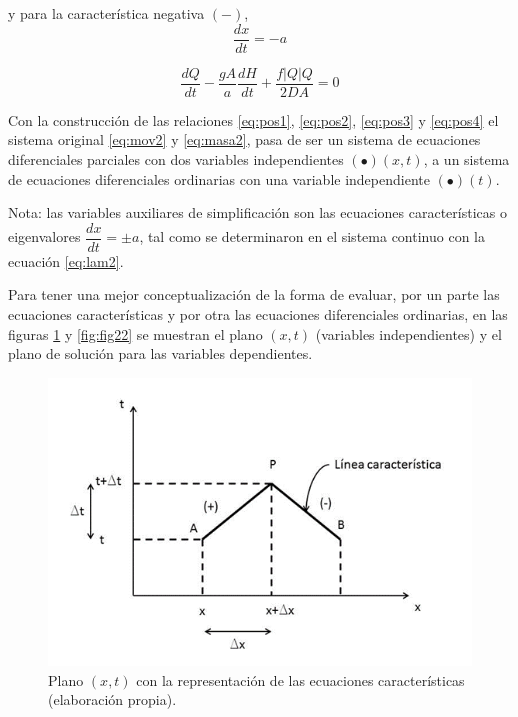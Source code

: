 \documentclass[letterpaper]{report}
\begin{document}
y para la característica negativa $(-)$,
\begin{equation}
	\frac{dx}{dt}=-a
	\label{eq:pos3}
\end{equation}

\begin{equation}
	\frac{dQ}{dt}-\frac{gA}{a}\frac{dH}{dt}+\frac{f\left|Q\right|Q}{2DA}=0
	\label{eq:pos4}
\end{equation}

Con la construcción de las relaciones \ref{eq:pos1}, \ref{eq:pos2}, \ref{eq:pos3} y \ref{eq:pos4} el sistema original \ref{eq:mov2} y \ref{eq:masa2}, pasa de ser un sistema de ecuaciones diferenciales parciales con dos variables independientes $(\bullet)(x,t)$, a un sistema de ecuaciones diferenciales ordinarias con una variable independiente $(\bullet)(t)$.\bigskip

Nota: las variables auxiliares de simplificación son las ecuaciones características o eigenvalores $\dfrac{dx}{dt}=\pm a$, tal como se determinaron en el sistema continuo con la ecuación \ref{eq:lam2}.\bigskip

Para tener una mejor conceptualización de la forma de evaluar, por un parte las ecuaciones características y por otra las ecuaciones diferenciales ordinarias, en las figuras \ref{fig:fig21} y \ref{fig:fig22} se muestran el plano $(x,t)$ (variables independientes) y el plano de solución para las variables dependientes.\bigskip

\begin{figure}[H]
	\centering
	\includegraphics[width=0.8\linewidth]{figuras/fig21}
	\caption{Plano $(x,t)$ con la representación de las ecuaciones características (elaboración propia).}
	\label{fig:fig21}
\end{figure}
\end{document}
